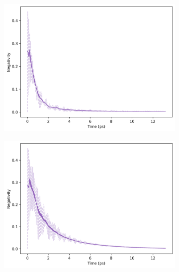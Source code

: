 \documentclass[11pt]{article}
\begin{document}
\begin{figure}[H]
    \centering
    \begin{subfigure}{0.45\textwidth}
        \centering
        \includegraphics[width=\linewidth]{Research Project/Code/results/ExVib/Open/Negativity/neg_spont_e0.png}
        \caption{}
        \label{fig:EVM_OQS_Neg_spont}
    \end{subfigure}
    \hfill
    \begin{subfigure}{0.45\textwidth}
        \centering
        \includegraphics[width=\linewidth]{Research Project/Code/results/ExVib/Open/Negativity/neg_therm_e0.png}
        \caption{}
        \label{fig:EVM_OQS_Neg_therm}
    \end{subfigure}
    

\end{figure}
\end{document}
